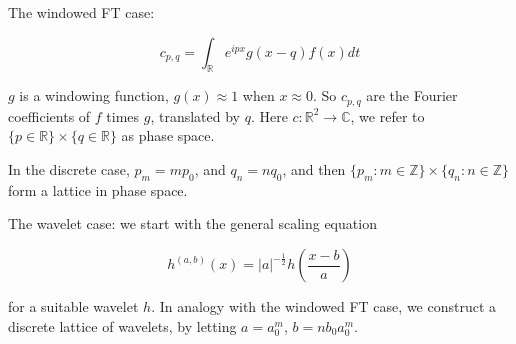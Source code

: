 \documentclass{beamer}
\newcommand{\ints}[0] { \mathbb{Z}}
\newcommand{\reals}[0] { \mathbb{R}}
\begin{document}
\begin{frame}

\begin{flushleft}
The windowed FT case:
\end{flushleft}

\begin{equation*}
c_{p,q} = \int_\reals e^{i p x} g(x-q)f(x) dt
\end{equation*}

\begin{flushleft}
$g$ is a windowing function, $g(x) \approx 1$ when $x \approx 0$. So $c_{p,q}$ are the Fourier coefficients of $f$ times $g$, translated by $q$. Here $c:\reals^2 \rightarrow \mathbb{C}$, we refer to $\{ p \in \reals \} \times \{ q \in \reals \}$ as phase space.
\end{flushleft}

\begin{flushleft}
In the discrete case, $p_m = m p_0$, and $q_n = n q_0$, and then $\{ p_m : m \in \ints \} \times \{ q_n :n \in \ints \}$ form a lattice in phase space.
\end{flushleft}

\end{frame}



\begin{frame}

\begin{flushleft}
The wavelet case: we start with the general scaling equation
\end{flushleft}

\begin{equation*}
h^{(a,b)}(x) = |a|^{-\frac{1}{2}} h \left( \frac{x-b}{a} \right)
\end{equation*}

\begin{flushleft}
for a suitable wavelet $h$. In analogy with the windowed FT case, we construct a discrete lattice of wavelets, by letting $a=a_0^m$, $b=n b_0 a_0^m$.
\end{flushleft}


\end{frame}
\end{document}
